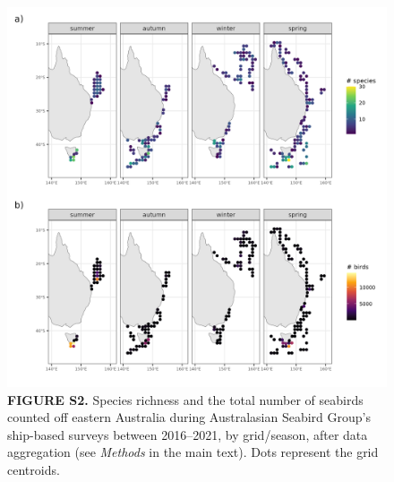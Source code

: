 \documentclass[
]{article}
\begin{document}
\begin{figure}
\centering
\includegraphics{../results/FigS2_map-effort-spp-richness-and-total-birds-seasons.png}
\caption{\textbf{FIGURE S2.} Species richness and the total number of
seabirds counted off eastern Australia during Australasian Seabird
Group's ship-based surveys between 2016--2021, by grid/season, after
data aggregation (see \emph{Methods} in the main text). Dots represent
the grid centroids.}
\end{figure}

\newpage
\end{document}
